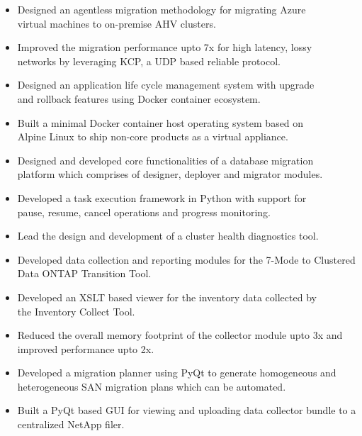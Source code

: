 \documentclass[10pt,a4paper,ragged2e,withhyper]{altacv}
\begin{document}
\begin{paracol}{2}


\begin{itemize}
\item Designed an agentless migration methodology for migrating Azure\\ virtual machines to on-premise AHV clusters.
\item Improved the migration performance upto 7x for high latency, lossy\\ networks by leveraging KCP, a UDP based reliable protocol.
\item Designed an application life cycle management system with upgrade\\ and rollback features using Docker container ecosystem.
\item Built a minimal Docker container host operating system based on\\ Alpine Linux to ship non-core products as a virtual appliance.
\item Designed and developed core functionalities of a database migration\\ platform which comprises of designer, deployer and migrator modules.
\item Developed a task execution framework in Python with support for\\  pause, resume, cancel operations and progress monitoring.
\item Lead the design and development of a cluster health diagnostics tool.
\end{itemize}

\divider

\begin{itemize}
\item Developed data collection and reporting modules for the 7-Mode to Clustered Data ONTAP Transition Tool.
\item Developed an XSLT based viewer for the inventory data collected by\\ the Inventory Collect Tool.
\item Reduced the overall memory footprint of the collector module upto 3x and improved performance upto 2x.
\item Developed a migration planner using PyQt to generate homogeneous and heterogeneous SAN migration plans which can be automated.
\item Built a PyQt based GUI for viewing and uploading data collector bundle to a centralized NetApp filer.
\end{itemize}


\end{paracol}
\end{document}
